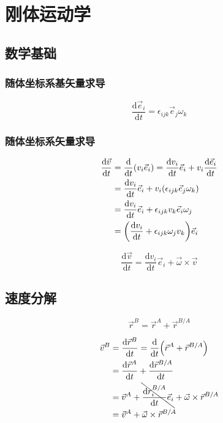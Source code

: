 \chapter{刚体运动学}
\section{数学基础}
\subsection{随体坐标系基矢量求导}
\begin{equation}
  \frac{\mathrm{d}\vec{e}_i}{\mathrm{d}t}=\epsilon_{ijk}\vec{e}_j\omega_k
\end{equation}
\subsection{随体坐标系矢量求导}
\begin{equation}
  \begin{split}
    \frac{\mathrm{d}\vec{v}}{\mathrm{d}t}&=\frac{\mathrm{d}}{\mathrm{d}t}(v_i\vec{e}_i)=\frac{\mathrm{d}v_i}{\mathrm{d}t}\vec{e}_i+v_i\frac{\mathrm{d}\vec{e}_i}{\mathrm{d}t}\\
    &=\frac{\mathrm{d}v_i}{\mathrm{d}t}\vec{e}_i+v_i(\epsilon_{ijk}\vec{e}_j\omega_k)\\
    &=\frac{\mathrm{d}v_i}{\mathrm{d}t}\vec{e}_i+\epsilon_{ijk}v_k\vec{e}_i\omega_j\\
    &=\qty(\frac{\mathrm{d}v_i}{\mathrm{d}t}+\epsilon_{ijk}\omega_jv_k)\vec{e}_i
  \end{split}
\end{equation}

\begin{equation}
  \frac{\mathrm{d}\vec{v}}{\mathrm{d}t}=\frac{\mathrm{d}v_i}{\mathrm{d}t}\vec{e}_i+\vec{\omega}\times\vec{v}
\end{equation}

\section{速度分解}
\begin{equation}
  \vec{r}^B=\vec{r}^A+\vec{r}^{B/A}
\end{equation}

\begin{equation}
  \begin{split}
    \vec{v}^B&=\frac{\mathrm{d}\vec{r}^B}{\mathrm{d}t}=\frac{\mathrm{d}}{\mathrm{d}t}\qty(\vec{r}^A+\vec{r}^{B/A})\\
    &=\frac{\mathrm{d}\vec{r}^A}{\mathrm{d}t}+\frac{\mathrm{d}\vec{r}^{B/A}}{\mathrm{d}t}\\
    &=\vec{v}^A+\bcancel{\frac{\mathrm{d}r^{B/A}_i}{\mathrm{d}t}\vec{e}_i}+\vec{\omega}\times\vec{r}^{B/A}\\
    &=\vec{v}^A+\vec{\omega}\times\vec{r}^{B/A}
  \end{split}
\end{equation}
